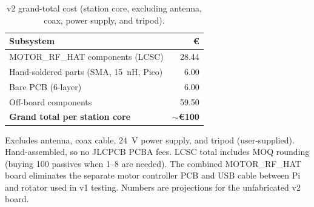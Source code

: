 \begin{table}[H]
    \centering
    \begin{tabular}{lr}
        \toprule
        Subsystem & \euro{} \\
        \midrule
        MOTOR\_RF\_HAT components (LCSC) & 28.44 \\
        Hand-soldered parts (SMA, 15~nH, Pico) & 6.00 \\
        Bare PCB (6-layer) & 6.00 \\
        Off-board components & 59.50 \\
        \midrule
        \textbf{Grand total per station core} & \textbf{$\sim$€100} \\
        \bottomrule
    \end{tabular}
    \caption{v2 grand-total cost (station core, excluding antenna, coax, power supply, and tripod).}
\end{table}

Excludes antenna, coax cable, 24~V power supply, and tripod (user-supplied). Hand-assembled, so no JLCPCB PCBA fees. LCSC total includes MOQ rounding (buying 100 passives when 1--8 are needed). The combined MOTOR\_RF\_HAT board eliminates the separate motor controller PCB and USB cable between Pi and rotator used in v1 testing. Numbers are projections for the unfabricated v2 board.
